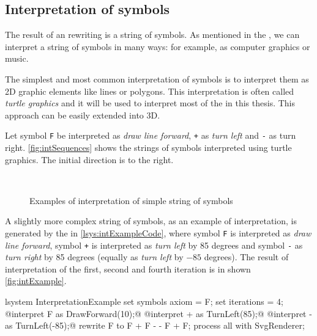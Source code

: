 \subsection{Interpretation of \lsystem symbols}

The result of an \lsystem rewriting is a string of symbols.
As mentioned in the , we can interpret a string of symbols in many ways: for example, as computer graphics or music.

The simplest and most common interpretation of \lsystem symbols is to interpret them as 2D graphic elements like lines or polygons.
This interpretation is often called \emph{turtle graphics} and it will be used to interpret most of the \lsystems in this thesis.
This approach can be easily extended into 3D.

Let symbol \texttt{F} be interpreted as \emph{draw line forward}, \texttt{+} as \emph{turn left} and \texttt{-} as turn right.
\autoref{fig:intSequences} shows the strings of symbols interpreted using turtle graphics.
The initial direction is to the right.

\begin{figure}[h]
	\centering
	 ~
	 ~
	\caption{Examples of interpretation of simple string of symbols}
	\label{fig:intSequences}
\end{figure}


A slightly more complex string of symbols, as an example of interpretation, is generated by the \lsystem in \autoref{lsys:intExampleCode}, where symbol \texttt{F} is interpreted as \emph{draw line forward},
	symbol \texttt{+} is interpreted as \emph{turn left} by 85 degrees and symbol \texttt{-} as \emph{turn right} by 85 degrees (equally as \emph{turn left} by $-85$ degrees).
The result of interpretation of the first, second and fourth iteration is in shown \autoref{fig:intExample}.

\begin{Lsystem}[label=lsys:intExampleCode,caption={Another symbol interpretation example}]
lsystem InterpretationExample {
	set symbols axiom = F;
	set iterations = 4;
	@interpret F as DrawForward(10);@
	@interpret + as TurnLeft(85);@
	@interpret - as TurnLeft(-85);@
	rewrite F to F + F - - F + F;
}
process all with SvgRenderer;
\end{Lsystem}

